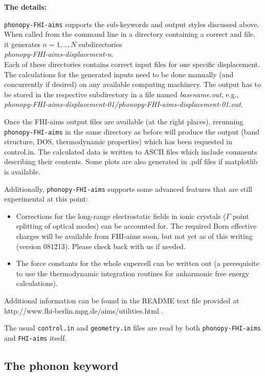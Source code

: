 \textbf{The details:}

\texttt{phonopy-FHI-aims} supports the  sub-keywords
and output styles discussed above. When called from the command 
line in a directory containing a correct  and
 file, it generates $n=1,..,N$ subdirectories \\ 
{\it
  phonopy-FHI-aims-displacement-n}. \\ 
Each of these directories contains
correct input files for one specific displacement. The calculations
for the generated inputs need to be done manually (and concurrently if
desired) on any available computing machinery. The output has
to be stored in the respective subdirectory in a file named {\it
  basename.out}, e.g., {\it
  phonopy-FHI-aims-displacement-01/phonopy-FHI-aims-displacement-01.out}. 

Once the FHI-aims output files are available (at the right places), rerunning 
\texttt{phonopy-FHI-aims} in the same directory as before will produce
the output (band structure, DOS, thermodynamic properties) which has been
requested in control.in. The calculated data is written to ASCII files
which include comments describing their contents. Some plots are also
generated in .pdf files if matplotlib is available. 

Additionally, \texttt{phonopy-FHI-aims} supports some
advanced features 
that are still experimental at this point:
\begin{itemize}
\item Corrections for the long-range electrostatic fields in ionic crystals
  ($\Gamma$ point splitting of optical modes) can be accounted
  for. The required Born effective charges will be available from
  FHI-aims soon, but not yet as of this writing (version
  081213). Please check back with us if needed.
\item The force constants for the whole supercell can be written out (a
  prerequisite to use the thermodynamic integration routines for anharmonic
  free energy calculations).
\end{itemize}
Additional information can be found in the README text file provided at
http://www.fhi-berlin.mpg.de/aims/utilities.html .


The usual \texttt{control.in} and \texttt{geometry.in} files are read
by both \texttt{phonopy-FHI-aims} and \texttt{FHI-aims} itself. 

\subsection*{The phonon keyword}

